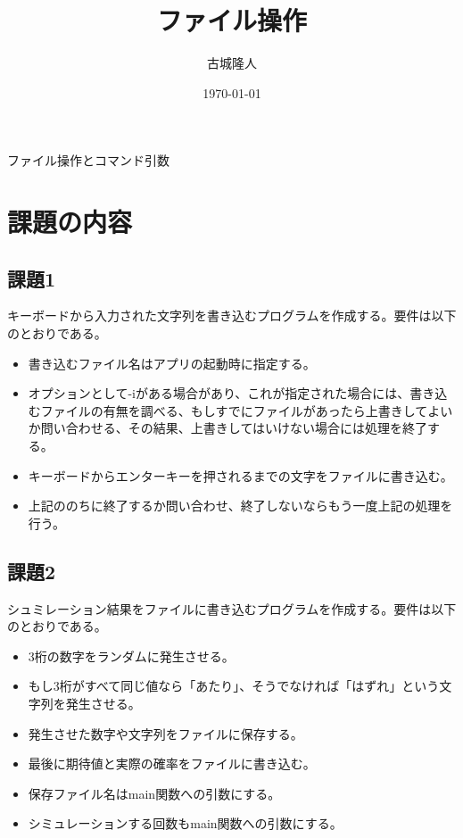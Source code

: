 \documentclass[dvipdfmx]{jsarticle}
\begin{document}
\title{ファイル操作}
\author{古城隆人}
\date{\today}
\maketitle


\newpage
\begin{center}
  \begin{center}
    \Huge ファイル操作とコマンド引数
  \end{center}
\end{center}


\section{課題の内容}
\subsection{課題1}
キーボードから入力された文字列を書き込むプログラムを作成する。要件は以下のとおりである。
\begin{itemize}
  \item 書き込むファイル名はアプリの起動時に指定する。
  \item オプションとして-iがある場合があり、これが指定された場合には、書き込むファイルの有無を調べる、もしすでにファイルがあったら上書きしてよいか問い合わせる、その結果、上書きしてはいけない場合には処理を終了する。
  \item キーボードからエンターキーを押されるまでの文字をファイルに書き込む。
  \item 上記ののちに終了するか問い合わせ、終了しないならもう一度上記の処理を行う。
\end{itemize}
\subsection{課題2}
シュミレーション結果をファイルに書き込むプログラムを作成する。要件は以下のとおりである。
\begin{itemize}
  \item 3桁の数字をランダムに発生させる。
  \item もし3桁がすべて同じ値なら「あたり」、そうでなければ「はずれ」という文字列を発生させる。
  \item 発生させた数字や文字列をファイルに保存する。
  \item 最後に期待値と実際の確率をファイルに書き込む。
  \item 保存ファイル名はmain関数への引数にする。
  \item シミュレーションする回数もmain関数への引数にする。
\end{itemize}
\end{document}
